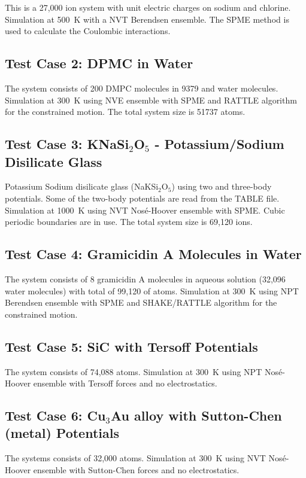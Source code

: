This is a 27,000 ion system with unit electric charges on sodium and
chlorine.  Simulation at 500~K with a NVT Berendsen ensemble.  The SPME
method is used to calculate the Coulombic interactions.

\subsection{Test Case 2: DPMC in Water}

The system consists of 200 DMPC molecules in 9379 and water molecules.
Simulation at 300~K using NVE ensemble with SPME and RATTLE algorithm
for the constrained motion.  The total system size is 51737 atoms.

\subsection{Test Case 3: KNaSi$_{2}$O$_{5}$ - Potassium/Sodium Disilicate Glass}

Potassium Sodium disilicate glass (NaKSi$_{2}$O$_{5}$) using two and
three-body potentials.  Some of the two-body potentials are read
from the TABLE file.  Simulation at 1000~K using NVT Nos\'e-Hoover
ensemble with SPME.  Cubic periodic boundaries are in use.  The
total system size is 69,120 ions.

\subsection{Test Case 4: Gramicidin A Molecules in Water}

The system consists of 8 gramicidin A molecules in aqueous solution
(32,096 water molecules) with total of 99,120 of atoms.  Simulation
at 300~K using NPT Berendsen ensemble with SPME and SHAKE/RATTLE
algorithm for the constrained motion.

\subsection{Test Case 5: SiC with Tersoff Potentials}

The system consists of 74,088 atoms.  Simulation at 300~K using NPT
Nos\'e-Hoover ensemble with Tersoff forces and no electrostatics.

\subsection{Test Case 6: Cu$_{3}$Au alloy with Sutton-Chen (metal) Potentials}

The systems consists of 32,000 atoms.  Simulation at 300~K using NVT
Nos\'e-Hoover ensemble with Sutton-Chen forces and no electrostatics.

